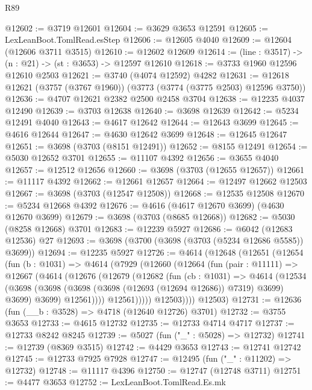 \begin{lexlean}{R89}
\begin{coremodule}
@12602 := @3719 @12601
@12604 := @3629 @3653 @12591
@12605 := LexLeanBoot.TomlRead.esStep
@12606 := @12605 @4040
@12609 := @12604 (@12606 @3711 @3515)
@12610 := @12602 @12609
@12614 := (line : @3517) -> (n : @21) -> (st : @3653) -> @12597 @12610
@12618 := @3733 @1960 @12596 @12610 @2503
@12621 := @3740 (@4074 @12592) @4282
@12631 := @12618 @12621 (@3757 (@3767 @1960)) (@3773 (@3774 (@3775 @2503) @12596 @3750))
@12636 := @4707 @12621 @2382 @2500 @2458 @3704
@12638 := @12235 @4037 @12490
@12639 := @3703 @12638
@12640 := @3698 @12639
@12642 := @5234 @12491 @4040
@12643 := @4617 @12642
@12644 := @12643 @3699
@12645 := @4616 @12644
@12647 := @4630 @12642 @3699
@12648 := @12645 @12647
@12651 := @3698 (@3703 (@8151 @12491))
@12652 := @8155 @12491
@12654 := @5030 @12652 @3701
@12655 := @11107 @4392
@12656 := @3655 @4040
@12657 := @12512 @12656
@12660 := @3698 (@3703 (@12655 @12657))
@12661 := @11117 @4392
@12662 := @12661 @12657
@12664 := @12497 @12662 @12503
@12667 := @3698 (@3703 (@12547 @12508))
@12668 := @12535 @12508
@12670 := @5234 @12668 @4392
@12676 := @4616 (@4617 @12670 @3699) (@4630 @12670 @3699)
@12679 := @3698 (@3703 (@8685 @12668))
@12682 := @5030 (@8258 @12668) @3701
@12683 := @12239 @5927
@12686 := @6042 (@12683 @12536) @27
@12693 := @3698 (@3700 (@3698 (@3703 (@5234 @12686 @5585)) @3699))
@12694 := @12235 @5927
@12726 := @4614
    (@12648
      (@12651
        (@12654
          (fun (b : @1031) =>
          @4614
            (@7929
              (@12660
                (@12664
                  (fun (pair : @11111) =>
                  @12667
                    (@4614
                      (@12676
                        (@12679
                          (@12682
                            (fun (cb : @1031) =>
                            @4614
                              (@12534
                                (@3698
                                  (@3698 (@3698 (@3698 (@12693 (@12694 @12686)) @7319) @3699) @3699)
                                  @3699)
                                @12561))))
                        @12561)))))
              @12503))))
      @12503)
@12731 := @12636 (fun (__b : @3528) => @4718 (@12640 @12726) @3701)
@12732 := @3755 @3653
@12733 := @4615 @12732
@12735 := @12733 @4714 @4717
@12737 := @12733 @8242 @8245
@12739 := @5027 (fun ("_" : @5028) => @12732)
@12741 := @12739 (@8369 @3515)
@12742 := @4429 @3653
@12743 := @12741 @12742
@12745 := @12733 @7925 @7928
@12747 := @12495 (fun ("_" : @11202) => @12732)
@12748 := @11117 @4396
@12750 := @12747 (@12748 @3711)
@12751 := @4477 @3653
@12752 := LexLeanBoot.TomlRead.Es.mk

\end{coremodule}
\end{lexlean}
